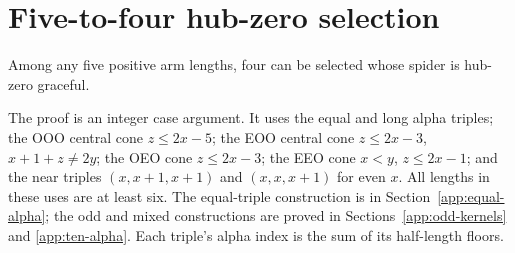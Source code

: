 \section{Five-to-four hub-zero selection}\label{app:five-to-four}
\begin{theorem}\label{fs:selection}
Among any five positive arm lengths, four can be selected whose spider is hub-zero graceful.
\end{theorem}
The proof is an integer case argument. It uses the equal and long alpha triples; the OOO central cone $z\le2x-5$; the EOO central cone $z\le2x-3$, $x+1+z\ne2y$; the OEO cone $z\le2x-3$; the EEO cone $x<y$, $z\le2x-1$; and the near triples $(x,x+1,x+1)$ and $(x,x,x+1)$ for even $x$. All lengths in these uses are at least six. The equal-triple construction is in Section~\ref{app:equal-alpha}; the odd and mixed constructions are proved in Sections~\ref{app:odd-kernels} and \ref{app:ten-alpha}. Each triple's alpha index is the sum of its half-length floors.

